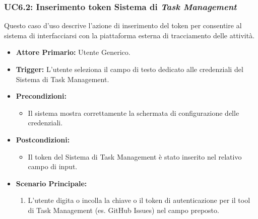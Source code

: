 \documentclass[12pt, a4paper]{article}
\begin{document}
\subsubsection{UC6.2: Inserimento token Sistema di \textit{Task Management}}\label{uc:6.2}
Questo caso d'uso descrive l'azione di inserimento del token per consentire al sistema di interfacciarsi con la piattaforma esterna di tracciamento delle attività.
\begin{itemize}
    \item \textbf{Attore Primario:} Utente Generico.
    \item \textbf{Trigger:} L'utente seleziona il campo di testo dedicato alle credenziali del Sistema di Task Management.
    \item \textbf{Precondizioni:}\begin{itemize}\item Il sistema mostra correttamente la schermata di configurazione delle credenziali.\end{itemize}
    \item \textbf{Postcondizioni:}\begin{itemize}\item Il token del Sistema di Task Management è stato inserito nel relativo campo di input.\end{itemize}
    \item \textbf{Scenario Principale:}
    \begin{enumerate}
        \item L'utente digita o incolla la chiave o il token di autenticazione per il tool di Task Management (es. GitHub Issues) nel campo preposto.
    \end{enumerate}
\end{itemize}
\end{document}
